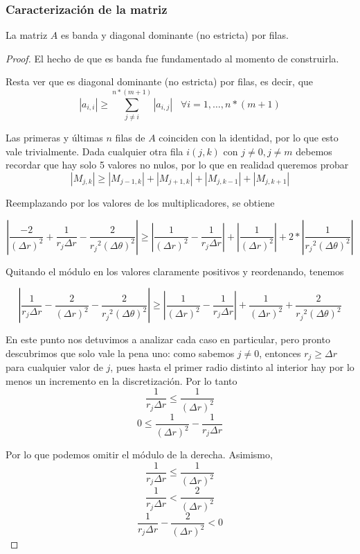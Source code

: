 \subsubsection{Caracterización de la matriz}

\begin{proposition}

La matriz $A$ es banda y diagonal dominante (no estricta) por filas.

\begin{proof}

El hecho de que es banda fue fundamentado al momento de construirla.

Resta ver que es diagonal dominante (no estricta) por filas, es decir, que $$|a_{i, i}| \geq \sum\limits_{j \neq i}^{n*(m+1)} |a_{i, j}| \hspace{10pt} \forall i = 1, \ldots, n*(m+1)$$

Las primeras y últimas $n$ filas de $A$ coinciden con la identidad, por lo que esto vale trivialmente. Dada cualquier otra fila $i(j, k)$ con $j \neq 0, j \neq m$ debemos recordar que hay solo 5 valores no nulos, por lo que en realidad queremos probar $$|M_{j, k}| \geq |M_{j-1, k}| + |M_{j+1, k}| + |M_{j, k-1}| + |M_{j, k+1}|$$

Reemplazando por los valores de los multiplicadores, se obtiene

$$\left|\frac{-2}{(\Delta r)^2} + \frac{1}{r_j \Delta r} - \frac{2}{{r_j}^2 (\Delta \theta)^2}\right| \geq \left|\frac{1}{(\Delta r)^2} - \frac{1}{r_j \Delta r}\right| + \left|\frac{1}{(\Delta r)^2}\right| + 2 * \left|\frac{1}{{r_j}^2(\Delta \theta)^2}\right| $$

Quitando el módulo en los valores claramente positivos y reordenando, tenemos

$$\left|\frac{1}{r_j \Delta r} - \frac{2}{(\Delta r)^2} - \frac{2}{{r_j}^2 (\Delta \theta)^2}\right| \geq \left|\frac{1}{(\Delta r)^2} - \frac{1}{r_j \Delta r}\right| + \frac{1}{(\Delta r)^2} + \frac{2}{{r_j}^2(\Delta \theta)^2} $$

En este punto nos detuvimos a analizar cada caso en particular, pero pronto descubrimos que solo vale la pena uno:
como sabemos $j \neq 0$, entonces $r_j \geq \Delta r$ para cualquier valor de $j$, pues hasta el primer radio distinto al interior hay por lo menos un incremento en la discretización. Por lo tanto 
$$\frac{1}{r_j \Delta r} \leq \frac{1}{(\Delta r)^2}$$
$$0 \leq \frac{1}{(\Delta r)^2} - \frac{1}{r_j \Delta r}$$

Por lo que podemos omitir el módulo de la derecha. Asimismo, 
$$ \frac{1}{r_j \Delta r} \leq \frac{1}{(\Delta r)^2} $$
$$ \frac{1}{r_j \Delta r} < \frac{2}{(\Delta r)^2} $$
$$ \frac{1}{r_j \Delta r} - \frac{2}{(\Delta r)^2} < 0 $$


\end{proof}
\end{proposition}
